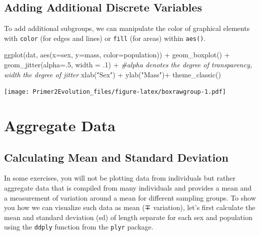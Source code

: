 \documentclass[
]{book}
\newenvironment{Shaded}{\begin{snugshade}}{\end{snugshade}}
\newcommand{\AttributeTok}[1]{\textcolor[rgb]{0.77,0.63,0.00}{#1}}
\newcommand{\CommentTok}[1]{\textcolor[rgb]{0.56,0.35,0.01}{\textit{#1}}}
\newcommand{\DecValTok}[1]{\textcolor[rgb]{0.00,0.00,0.81}{#1}}
\newcommand{\FunctionTok}[1]{\textcolor[rgb]{0.00,0.00,0.00}{#1}}
\newcommand{\NormalTok}[1]{#1}
\newcommand{\SpecialCharTok}[1]{\textcolor[rgb]{0.00,0.00,0.00}{#1}}
\newcommand{\StringTok}[1]{\textcolor[rgb]{0.31,0.60,0.02}{#1}}
\begin{document}
\hypertarget{adding-additional-discrete-variables}{%
\subsection{Adding Additional Discrete Variables}\label{adding-additional-discrete-variables}}

To add additional subgroups, we can manipulate the color of graphical elements with \texttt{color} (for edges and lines) or \texttt{fill} (for areas) within \texttt{aes()}.

\begin{Shaded}
\begin{Highlighting}[]
\FunctionTok{ggplot}\NormalTok{(dat, }\FunctionTok{aes}\NormalTok{(}\AttributeTok{x=}\NormalTok{sex, }\AttributeTok{y=}\NormalTok{mass, }\AttributeTok{color=}\NormalTok{population)) }\SpecialCharTok{+}
    \FunctionTok{geom\_boxplot}\NormalTok{() }\SpecialCharTok{+}
    \FunctionTok{geom\_jitter}\NormalTok{(}\AttributeTok{alpha=}\NormalTok{.}\DecValTok{5}\NormalTok{, }\AttributeTok{width =}\NormalTok{ .}\DecValTok{1}\NormalTok{) }\SpecialCharTok{+} \CommentTok{\#alpha denotes the degree of transparency, width the degree of jitter}
    \FunctionTok{xlab}\NormalTok{(}\StringTok{"Sex"}\NormalTok{) }\SpecialCharTok{+}
    \FunctionTok{ylab}\NormalTok{(}\StringTok{"Mass"}\NormalTok{)}\SpecialCharTok{+}
    \FunctionTok{theme\_classic}\NormalTok{()}
\end{Highlighting}
\end{Shaded}

\texttt{[image: Primer2Evolution\_files/figure-latex/boxrawgroup-1.pdf]}

\hypertarget{aggregate-data}{%
\section{Aggregate Data}\label{aggregate-data}}

\hypertarget{calculating-mean-and-standard-deviation}{%
\subsection{Calculating Mean and Standard Deviation}\label{calculating-mean-and-standard-deviation}}

In some exercises, you will not be plotting data from individuals but rather aggregate data that is compiled from many individuals and provides a mean and a measurement of variation around a mean for different sampling groups. To show you how we can visualize such data as mean (∓ variation), let's first calculate the mean and standard deviation (sd) of length separate for each sex and population using the \texttt{ddply} function from the \texttt{plyr} package.
\end{document}
